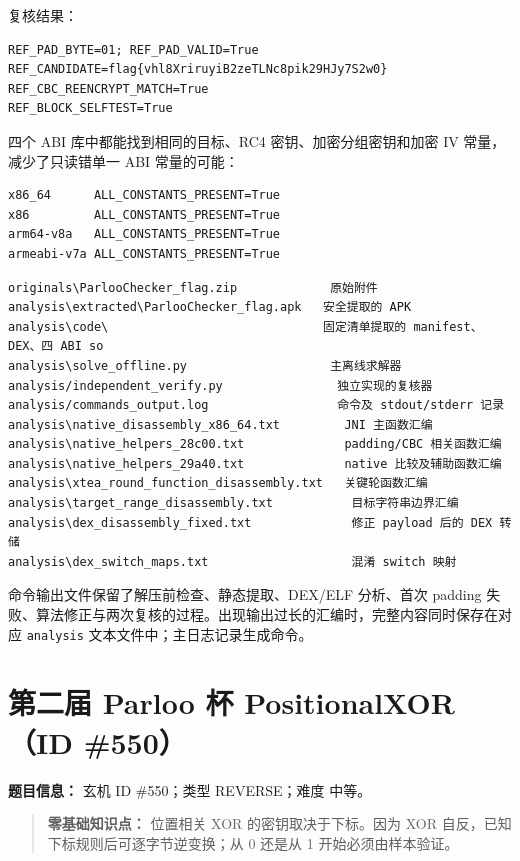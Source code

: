 复核结果：

\begin{verbatim}
REF_PAD_BYTE=01; REF_PAD_VALID=True
REF_CANDIDATE=flag{vhl8XriruyiB2zeTLNc8pik29HJy7S2w0}
REF_CBC_REENCRYPT_MATCH=True
REF_BLOCK_SELFTEST=True
\end{verbatim}

四个 ABI 库中都能找到相同的目标、RC4 密钥、加密分组密钥和加密 IV 常量，减少了只读错单一 ABI 常量的可能：

\begin{verbatim}
x86_64      ALL_CONSTANTS_PRESENT=True
x86         ALL_CONSTANTS_PRESENT=True
arm64-v8a   ALL_CONSTANTS_PRESENT=True
armeabi-v7a ALL_CONSTANTS_PRESENT=True
\end{verbatim}

\begin{verbatim}
originals\ParlooChecker_flag.zip             原始附件
analysis\extracted\ParlooChecker_flag.apk   安全提取的 APK
analysis\code\                              固定清单提取的 manifest、DEX、四 ABI so
analysis\solve_offline.py                    主离线求解器
analysis/independent_verify.py                独立实现的复核器
analysis/commands_output.log                  命令及 stdout/stderr 记录
analysis\native_disassembly_x86_64.txt         JNI 主函数汇编
analysis\native_helpers_28c00.txt              padding/CBC 相关函数汇编
analysis\native_helpers_29a40.txt              native 比较及辅助函数汇编
analysis\xtea_round_function_disassembly.txt   关键轮函数汇编
analysis\target_range_disassembly.txt           目标字符串边界汇编
analysis\dex_disassembly_fixed.txt              修正 payload 后的 DEX 转储
analysis\dex_switch_maps.txt                    混淆 switch 映射
\end{verbatim}

命令输出文件保留了解压前检查、静态提取、DEX/ELF 分析、首次 padding 失败、算法修正与两次复核的过程。出现输出过长的汇编时，完整内容同时保存在对应 \texttt{analysis} 文本文件中；主日志记录生成命令。

\section{第二届 Parloo 杯 PositionalXOR（ID \#550）}\label{ux7b2cux4e8cux5c4a-parloo-ux676f-positionalxorid-550}

\textbf{题目信息：} 玄机 ID \#550；类型 REVERSE；难度 中等。

\begin{quote}
\textbf{零基础知识点：} 位置相关 XOR 的密钥取决于下标。因为 XOR 自反，已知下标规则后可逐字节逆变换；从 0 还是从 1 开始必须由样本验证。
\end{quote}

